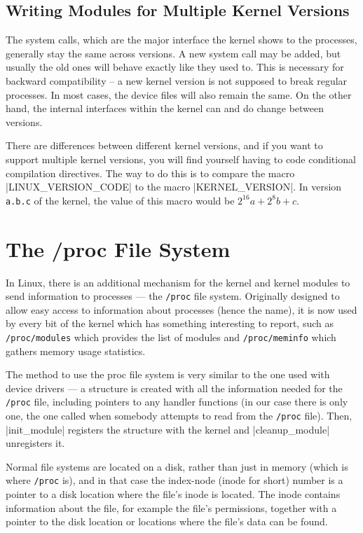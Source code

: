 \documentclass[10pt, oneside]{book}
\begin{document}

\subsection{Writing Modules for Multiple Kernel Versions}
\label{sec:modules_for_versions}
The system calls, which are the major interface the kernel shows to the processes, generally stay the same across versions.
A new system call may be added, but usually the old ones will behave exactly like they used to.
This is necessary for backward compatibility -- a new kernel version is not supposed to break regular processes.
In most cases, the device files will also remain the same. On the other hand, the internal interfaces within the kernel can and do change between versions.

There are differences between different kernel versions, and if you want to support multiple kernel versions, you will find yourself having to code conditional compilation directives.
The way to do this is to compare the macro \cpp|LINUX_VERSION_CODE| to the macro \cpp|KERNEL_VERSION|.
In version \verb|a.b.c| of the kernel, the value of this macro would be \(2^{16}a+2^{8}b+c\).

\section{The /proc File System}
\label{sec:procfs}
In Linux, there is an additional mechanism for the kernel and kernel modules to send information to processes --- the \verb|/proc| file system.
Originally designed to allow easy access to information about processes (hence the name), it is now used by every bit of the kernel which has something interesting to report, such as \verb|/proc/modules| which provides the list of modules and \verb|/proc/meminfo| which gathers memory usage statistics.

The method to use the proc file system is very similar to the one used with device drivers --- a structure is created with all the information needed for the \verb|/proc| file, including pointers to any handler functions (in our case there is only one, the one called when somebody attempts to read from the \verb|/proc| file).
Then, \cpp|init_module| registers the structure with the kernel and \cpp|cleanup_module| unregisters it.

Normal file systems are located on a disk, rather than just in memory (which is where \verb|/proc| is), and in that case the index-node (inode for short) number is a pointer to a disk location where the file's inode is located.
The inode contains information about the file, for example the file's permissions, together with a pointer to the disk location or locations where the file's data can be found.
\end{document}
